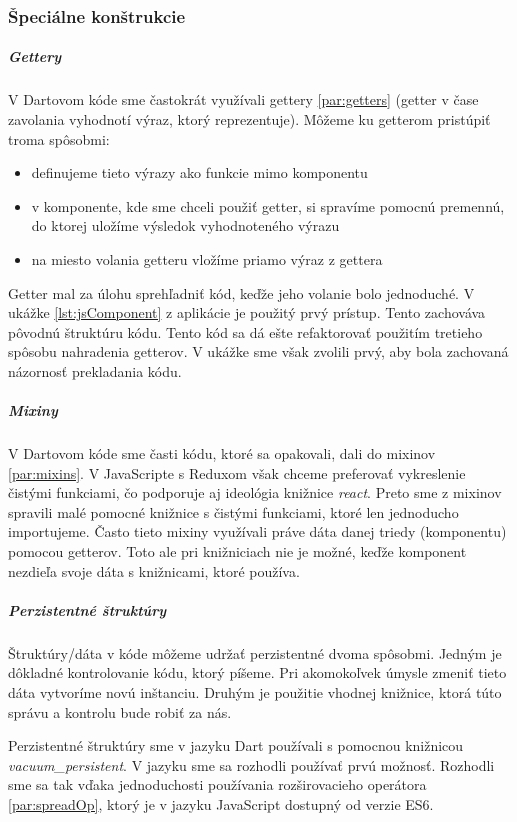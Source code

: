 

\subsubsection{Špeciálne konštrukcie}

\subparagraph{Gettery}
V Dartovom kóde sme častokrát využívali gettery \ref{par:getters} (getter v čase zavolania vyhodnotí výraz, ktorý reprezentuje). Môžeme ku getterom pristúpiť troma spôsobmi: 
\begin{itemize}
  \item definujeme tieto výrazy ako funkcie mimo komponentu
  \item v komponente, kde sme chceli použiť getter, si spravíme pomocnú premennú, do ktorej uložíme výsledok vyhodnoteného výrazu
  \item na miesto volania getteru vložíme priamo výraz z gettera
\end{itemize}

Getter mal za úlohu sprehľadniť kód, keďže jeho volanie bolo jednoduché.
V ukážke \ref{lst:jsComponent} z aplikácie je použitý prvý prístup. Tento zachováva pôvodnú štruktúru kódu. Tento kód sa dá ešte refaktorovať použitím tretieho spôsobu nahradenia getterov. V ukážke sme však zvolili prvý, aby bola zachovaná názornosť prekladania kódu.

\subparagraph{Mixiny}
V Dartovom kóde sme časti kódu, ktoré sa opakovali, dali do mixinov \ref{par:mixins}. V JavaScripte s Reduxom však chceme preferovať vykreslenie čistými funkciami, čo podporuje aj ideológia knižnice \emph{react}. Preto sme z mixinov spravili malé pomocné knižnice s čistými funkciami, ktoré len jednoducho importujeme. Často tieto mixiny využívali práve dáta danej triedy (komponentu) pomocou getterov. Toto ale pri knižniciach nie je možné, keďže komponent nezdieľa svoje dáta s knižnicami, ktoré používa.

\subparagraph{Perzistentné štruktúry}
Štruktúry/dáta v kóde môžeme udržať perzistentné dvoma spôsobmi. 
Jedným je dôkladné kontrolovanie kódu, ktorý píšeme. Pri akomokoľvek úmysle zmeniť tieto dáta vytvoríme novú inštanciu.
Druhým je použitie vhodnej knižnice, ktorá túto správu a kontrolu bude robiť za nás.

Perzistentné štruktúry sme v jazyku Dart používali s pomocnou knižnicou \emph{vacuum\_persistent}. V jazyku \JS{} sme sa rozhodli používať prvú možnosť. Rozhodli sme sa tak vďaka jednoduchosti používania rozširovacieho operátora \ref{par:spreadOp}, ktorý je v jazyku JavaScript dostupný od verzie ES6.

